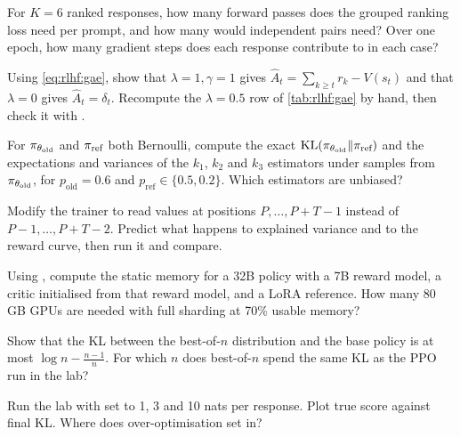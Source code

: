 \begin{exercise}
For $K=6$ ranked responses, how many forward passes does the grouped ranking loss need per prompt, and how
many would independent pairs need? Over one epoch, how many gradient steps does each response contribute
to in each case?
\end{exercise}

\begin{exercise}
Using \cref{eq:rlhf:gae}, show that $\lambda=1,\gamma=1$ gives $\hat A_t=\sum_{k\ge t}r_k-V(s_t)$ and that
$\lambda=0$ gives $\hat A_t=\delta_t$. Recompute the $\lambda=0.5$ row of \cref{tab:rlhf:gae} by hand,
then check it with .
\end{exercise}

\begin{exercise}[KL estimators]
For $\pi_{\theta_{\text{old}}}$ and $\pi_{\text{ref}}$ both Bernoulli, compute the exact $\operatorname{KL}(\pi_{\theta_{\text{old}}}\|\pi_{\text{ref}})$ and the expectations and
variances of the $k_1$, $k_2$ and $k_3$ estimators under samples from $\pi_{\theta_{\text{old}}}$, for
$p_{\text{old}}=0.6$ and $p_{\text{ref}}\in\{0.5,0.2\}$. Which estimators are unbiased?
\end{exercise}

\begin{exercise}
Modify the trainer to read values at positions $P,\dots,P+T-1$ instead of $P-1,\dots,P+T-2$. Predict
what happens to explained variance and to the reward curve, then run it and compare.
\end{exercise}

\begin{exercise}
Using , compute the static memory for a 32B policy with a 7B reward model, a
critic initialised from that reward model, and a LoRA reference. How many 80\,GB GPUs are needed with full
sharding at 70\% usable memory?
\end{exercise}

\begin{exercise}[Best-of-$n$ KL]
Show that the KL between the best-of-$n$ distribution and the base policy is at most $\log n-\frac{n-1}{n}$.
For which $n$ does best-of-$n$ spend the same KL as the PPO run in the lab?
\end{exercise}

\begin{exercise}[Adaptive KL]
Run the lab with  set to 1, 3 and 10 nats per response. Plot true score against final
KL. Where does over-optimisation set in?
\end{exercise}

